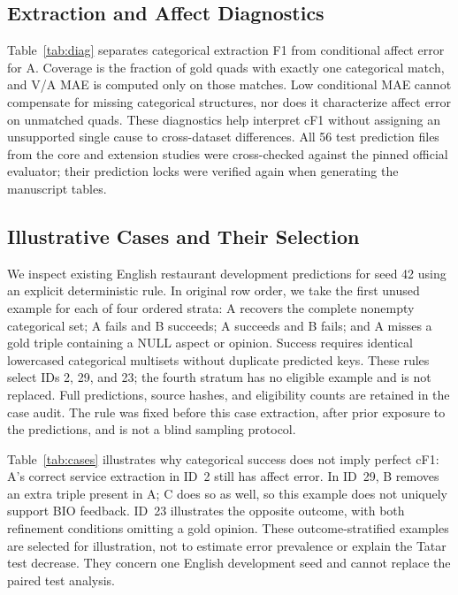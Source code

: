 \documentclass[conference]{IEEEtran}
\begin{document}
\subsection{Extraction and Affect Diagnostics}

Table~\ref{tab:diag} separates categorical extraction F1 from conditional affect error for A. Coverage is the fraction of gold quads with exactly one categorical match, and V/A MAE is computed only on those matches. Low conditional MAE cannot compensate for missing categorical structures, nor does it characterize affect error on unmatched quads. These diagnostics help interpret cF1 without assigning an unsupported single cause to cross-dataset differences. All 56 test prediction files from the core and extension studies were cross-checked against the pinned official evaluator; their prediction locks were verified again when generating the manuscript tables.

\subsection{Illustrative Cases and Their Selection}

We inspect existing English restaurant development predictions for seed 42 using an explicit deterministic rule. In original row order, we take the first unused example for each of four ordered strata: A recovers the complete nonempty categorical set; A fails and B succeeds; A succeeds and B fails; and A misses a gold triple containing a NULL aspect or opinion. Success requires identical lowercased categorical multisets without duplicate predicted keys. These rules select IDs 2, 29, and 23; the fourth stratum has no eligible example and is not replaced. Full predictions, source hashes, and eligibility counts are retained in the case audit. The rule was fixed before this case extraction, after prior exposure to the predictions, and is not a blind sampling protocol.

Table~\ref{tab:cases} illustrates why categorical success does not imply perfect cF1: A's correct service extraction in ID~2 still has affect error. In ID~29, B removes an extra triple present in A; C does so as well, so this example does not uniquely support BIO feedback. ID~23 illustrates the opposite outcome, with both refinement conditions omitting a gold opinion. These outcome-stratified examples are selected for illustration, not to estimate error prevalence or explain the Tatar test decrease. They concern one English development seed and cannot replace the paired test analysis.
\end{document}
